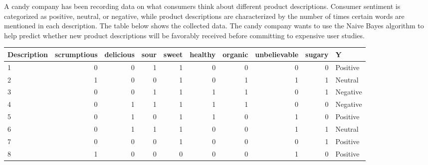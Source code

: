 \documentclass[12pt, letterpaper]{article}
\begin{document}
    A candy company has been recording data on what consumers think about different product descriptions. Consumer sentiment is categorized as positive, neutral, or negative, while product descriptions are characterized by the number of times certain words are mentioned in each description. The table below shows the collected data. The candy company wants to use the Naive Bayes algorithm to help predict whether new product descriptions will be favorably received before committing to expensive user studies.\\
    
    \begin{table}[h!]
    \centering
    \small
    \begin{tabular}{|l | r | r | r | r | r | r | r | r | l|}
    \hline
    Description & scrumptious & delicious & sour & sweet & healthy & organic & unbelievable & sugary & Y \\ \hline
    1           & 0           & 0         & 1    & 1     & 0       & 0       & 0            & 0      & Positive \\
    2           & 1           & 0         & 0    & 1     & 0       & 1       & 1            & 1      & Neutral\\
    3           & 0           & 0         & 1    & 1     & 1       & 1       & 0            & 1      & Negative\\
    4           & 0           & 1         & 1    & 1     & 1       & 1       & 0            & 0      & Negative\\
    5           & 0           & 1         & 0    & 1     & 1       & 0       & 1            & 0      & Positive\\
    6           & 0           & 1         & 1    & 1     & 0       & 0       & 1            & 1      & Neutral\\
    7           & 0           & 0         & 0    & 1     & 0       & 0       & 0            & 1      & Positive\\
    8           & 1           & 0         & 0    & 0     & 0       & 0       & 1            & 0      & Positive\\
    \hline
    \end{tabular}
    \end{table}
    
\end{document}
